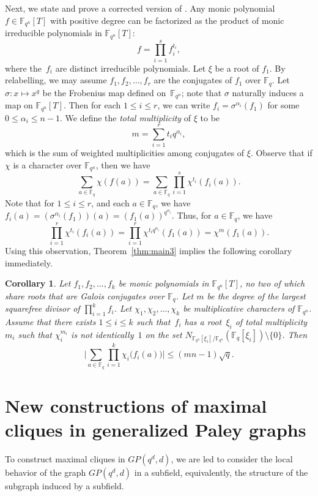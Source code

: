 \documentclass[12pt,reqno]{amsart}
\newtheorem{cor}[thm]{Corollary}
\theoremstyle{definition}
\newcommand{\F}{\mathbb{F}}
\begin{document}
Next, we state and prove a corrected version of \cite[Corollary 2.4]{W97}. Any monic polynomial $f \in \F_{q^n}[T]$ with positive degree can be factorized as the product of monic irreducible polynomials in $\F_{q^n}[T]$:
$$
f=\prod_{i=1}^{s} f_i^{t_i},
$$
where the~$f_i$ are distinct irreducible polynomials. Let $\xi$ be a root of $f_1$. By relabelling, we may assume $f_1,f_2, \ldots, f_{r}$ are the conjugates of $f_1$ over $\F_q$. Let $\sigma\colon x \mapsto x^q$ be the Frobenius map defined on~$\F_{q^n}$; note that $\sigma$ naturally induces a map on $\F_{q^n}[T]$. Then for each $1 \leq i \leq r$, we can write $f_i=\sigma^{\alpha_i}(f_1)$ for some $0\le\alpha_i\le n-1$. We define the \emph{total multiplicity} of $\xi$ to be
$$
m=\sum_{i=1}^{r} t_iq^{\alpha_i},
$$
which is the sum of weighted multiplicities among conjugates of $\xi$.
Observe that if $\chi$ is a character over $\F_{q^n}$, then we have
$$
\sum_{a \in \F_q} \chi(f(a))=\sum_{a \in \F_q} \prod_{i=1}^s \chi^{t_i}(f_i(a)).
$$
Note that for $1 \leq i \leq r$, and each $a \in \F_q$, we have $f_i(a)=(\sigma^{\alpha_i}(f_1))(a)=(f_1(a))^{q^{\alpha_i}}$. Thus, for $a \in \F_q$, we have
$$
\prod_{i=1}^{r} \chi^{t_i}(f_i(a))=\prod_{i=1}^{r} \chi^{t_iq^{\alpha_i}}(f_1(a))=\chi^m(f_1(a)).
$$
Using this observation, Theorem~\ref{thm:main3} implies the following corollary immediately. 
\begin{cor}
Let $f_1, f_2,\ldots, f_k$ be monic polynomials in $\F_{q^n}[T]$, no two of which share roots that are Galois conjugates over $\F_q$. Let $m$ be the degree of the largest squarefree divisor of $\prod_{i=1}^kf_i$. Let $\chi_1,\chi_2,\ldots, \chi_k$ be multiplicative characters of $\F_{q^n}$. Assume that there exists $1\leq i \leq k$ such that~$f_i$ has a root~$\xi_i$ of total multiplicity~$m_i$ such that $\chi_i^{m_i}$ is not identically~$1$ on the set $N_{\F_{q^n}[\xi_i]/\F_{q^n}}(\F_q[\xi_i]) \setminus \{0\}$. Then
$$\bigg |\sum_{a\in\mathbb{F}_q}\prod_{i=1}^k\chi_i\big(f_i(a)\big) \bigg|\le(mn-1)\sqrt q .$$
\end{cor}

\section{New constructions of maximal cliques in generalized Paley graphs}\label{sec4}

To construct maximal cliques in $GP(q^d,d)$, we are led to consider the local behavior of the graph $GP(q^d,d)$ in a subfield, equivalently, the structure of the subgraph induced by a subfield.
\end{document}
